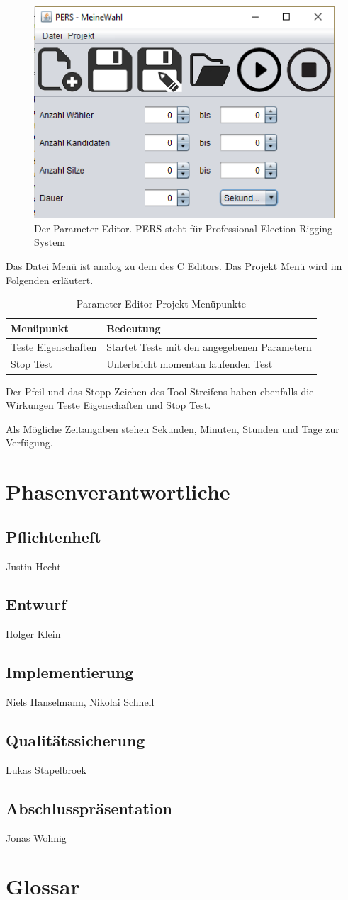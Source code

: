 \documentclass[a4paper]{scrreprt}
\begin{document}
\begin{figure}[H]
\includegraphics[scale=1]{Parameter-editor.png}
\caption{Der Parameter Editor. PERS steht für Professional Election Rigging System}
\label{Parameter-editor}
\end{figure}

Das Datei Menü ist analog zu dem des C Editors. Das Projekt Menü wird im Folgenden erläutert. 

\begin{table}[H]
\begin{tabular}{|p{3cm}|p{12cm}|}
Menüpunkt & Bedeutung \\
\hline
Teste Eigenschaften & Startet Tests mit den angegebenen Parametern \\
Stop Test & Unterbricht momentan laufenden Test
\end{tabular}
\label{Parameter-Projekt-Menü}
\caption{Parameter Editor Projekt Menüpunkte}
\end{table}

Der Pfeil und das Stopp-Zeichen des Tool-Streifens haben ebenfalls die Wirkungen Teste Eigenschaften und Stop Test. 

Als Mögliche Zeitangaben stehen Sekunden, Minuten, Stunden und Tage zur Verfügung.

\chapter{Phasenverantwortliche}
\section{Pflichtenheft} Justin Hecht
\section{Entwurf} Holger Klein 
\section{Implementierung} Niels Hanselmann, Nikolai Schnell
\section{Qualitätssicherung} Lukas Stapelbroek
\section{Abschlusspräsentation} Jonas Wohnig

\chapter{Glossar}
 

\printglossaries
 

 
\end{document}
